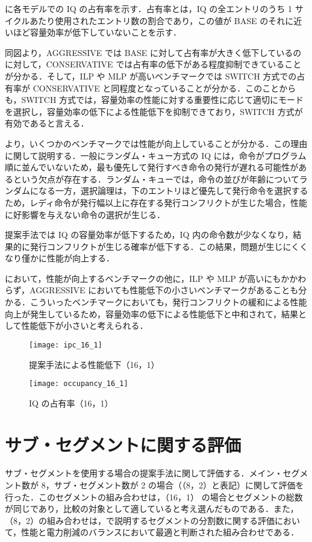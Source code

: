 に各モデルでの IQ の占有率を示す．占有率とは，IQ の全エントリのうち 1 サイクルあたり使用されたエントリ数の割合であり，この値が BASE のそれに近いほど容量効率が低下していないことを示す．

同図より，AGGRESSIVE では BASE に対して占有率が大きく低下しているのに対して，CONSERVATIVE では占有率の低下がある程度抑制できていることが分かる．そして，ILP や MLP が高いベンチマークでは SWITCH 方式での占有率が CONSERVATIVE と同程度となっていることが分かる．このことからも，SWITCH 方式では，容量効率の性能に対する重要性に応じて適切にモードを選択し，容量効率の低下による性能低下を抑制できており，SWITCH 方式が有効であると言える．

より，いくつかのベンチマークでは性能が向上していることが分かる．この理由に関して説明する．一般にランダム・キュー方式の IQ には，命令がプログラム順に並んでいないため，最も優先して発行すべき命令の発行が遅れる可能性があるという欠点が存在する．ランダム・キューでは，命令の並びが年齢についてランダムになる一方，選択論理は，下のエントリほど優先して発行命令を選択するため，レディ命令が発行幅以上に存在する発行コンフリクトが生じた場合，性能に好影響を与えない命令の選択が生じる．

提案手法では IQ の容量効率が低下するため，IQ 内の命令数が少なくなり，結果的に発行コンフリクトが生じる確率が低下する．この結果，問題が生じにくくなり僅かに性能が向上する．

において，性能が向上するベンチマークの他に，ILP や MLP が高いにもかかわらず，AGGRESSIVE においても性能低下の小さいベンチマークがあることも分かる．こういったベンチマークにおいても，発行コンフリクトの緩和による性能向上が発生しているため，容量効率の低下による性能低下と中和されて，結果として性能低下が小さいと考えられる．

\begin{figure}[htb]
  \centering
  \texttt{[image: ipc\_16\_1]}
  \caption{提案手法による性能低下（16，1）}
  \label{fig:ipc_16_1}
\end{figure}

\begin{figure}[htb]
  \centering
  \texttt{[image: occupancy\_16\_1]}
  \caption{IQ の占有率（16，1）}
  \label{fig:occupancy_16_1}
\end{figure}

\clearpage

\section{サブ・セグメントに関する評価}
\label{sec:eval_subseg}
サブ・セグメントを使用する場合の提案手法に関して評価する．メイン・セグメント数が 8，サブ・セグメント数が 2 の場合（（8，2）と表記）に関して評価を行った．このセグメントの組み合わせは，（16，1） の場合とセグメントの総数が同じであり，比較の対象として適していると考え選んだものである．また，（8，2）の組み合わせは，で説明するセグメントの分割数に関する評価において，性能と電力削減のバランスにおいて最適と判断された組み合わせである．

